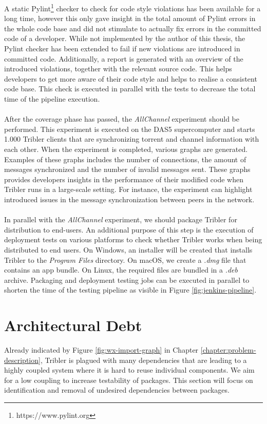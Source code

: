 \noindent A static Pylint\footnote{https://www.pylint.org} checker to check for code style violations has been available for a long time, however this only gave insight in the total amount of Pylint errors in the whole code base and did not stimulate to actually fix errors in the committed code of a developer. While not implemented by the author of this thesis, the Pylint checker has been extended to fail if new violations are introduced in committed code. Additionally, a report is generated with an overview of the introduced violations, together with the relevant source code. This helps developers to get more aware of their code style and helps to realise a consistent code base. This check is executed in parallel with the tests to decrease the total time of the pipeline execution.\\\\
After the coverage phase has passed, the \emph{AllChannel} experiment should be performed. This experiment is executed on the DAS5 supercomputer and starts 1.000 Tribler clients that are synchronizing torrent and channel information with each other. When the experiment is completed, various graphs are generated. Examples of these graphs includes the number of connections, the amount of messages synchronized and the number of invalid messages sent. These graphs provides developers insights in the performance of their modified code when Tribler runs in a large-scale setting. For instance, the experiment can highlight introduced issues in the message synchronization between peers in the network.\\\\
In parallel with the \emph{AllChannel} experiment, we should package Tribler for distribution to end-users. An additional purpose of this step is the execution of deployment tests on various platforms to check whether Tribler works when being distributed to end users. On Windows, an installer will be created that installs Tribler to the \emph{Program Files} directory. On macOS, we create a \emph{.dmg} file that contains an app bundle. On Linux, the required files are bundled in a \emph{.deb} archive. Packaging and deployment testing jobs can be executed in parallel to shorten the time of the testing pipeline as visible in Figure \ref{fig:jenkins-pipeline}.

\section{Architectural Debt}
Already indicated by Figure \ref{fig:wx-import-graph} in Chapter \ref{chapter:problem-description}, Tribler is plagued with many dependencies that are leading to a highly coupled system where it is hard to reuse individual components. We aim for a low coupling to increase testability of packages. This section will focus on identification and removal of undesired dependencies between packages.

